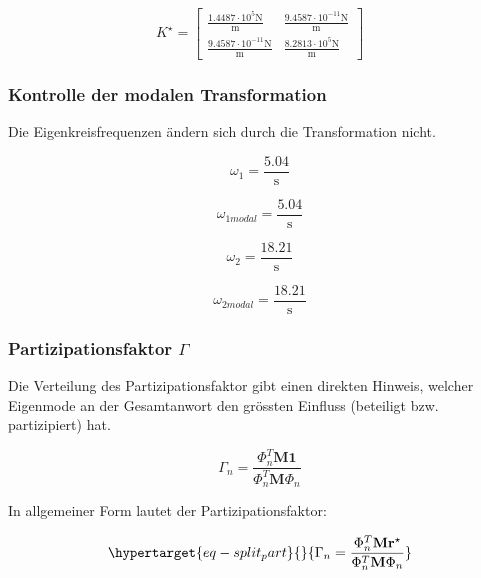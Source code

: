 \documentclass[
  letterpaper,
  DIV=11]{scrreprt}
\begin{document}
\begin{equation}K^{\star} = \left[\begin{matrix}\frac{1.4487 \cdot 10^{5} \text{N}}{\text{m}} & \frac{9.4587 \cdot 10^{-11} \text{N}}{\text{m}}\\\frac{9.4587 \cdot 10^{-11} \text{N}}{\text{m}} & \frac{8.2813 \cdot 10^{5} \text{N}}{\text{m}}\end{matrix}\right]\end{equation}

\hypertarget{kontrolle-der-modalen-transformation-2}{%
\subsubsection{Kontrolle der modalen
Transformation}\label{kontrolle-der-modalen-transformation-2}}

Die Eigenkreisfrequenzen ändern sich durch die Transformation nicht.

\begin{equation}\omega_{1} = \frac{5.04}{\text{s}}\end{equation}

\begin{equation}\omega_{1 modal} = \frac{5.04}{\text{s}}\end{equation}

\begin{equation}\omega_{2} = \frac{18.21}{\text{s}}\end{equation}

\begin{equation}\omega_{2 modal} = \frac{18.21}{\text{s}}\end{equation}

\hypertarget{partizipationsfaktor-gamma-1}{%
\subsubsection{\texorpdfstring{Partizipationsfaktor
\(\Gamma\)}{Partizipationsfaktor \textbackslash Gamma}}\label{partizipationsfaktor-gamma-1}}

Die Verteilung des Partizipationsfaktor gibt einen direkten Hinweis,
welcher Eigenmode an der Gesamtanwort den grössten Einfluss (beteiligt
bzw. partizipiert) hat.

\[\Gamma_n = \frac{\Phi_n^T \mathbf{M 1}}{\Phi_n^T \mathbf{M}\Phi_n}\]

In allgemeiner Form lautet der Partizipationsfaktor:

\begin{equation}\protect\hypertarget{eq-split_part}{}{
\Gamma_n = \frac{\Phi_n^T \mathbf{M r^\star}}{\Phi_n^T \mathbf{M}\Phi_n}
}\label{eq-split_part}\end{equation}
\end{document}
